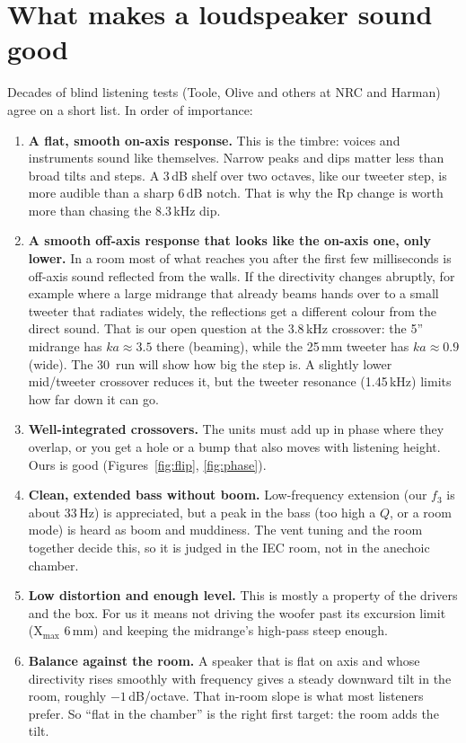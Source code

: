 \documentclass[11pt,a4paper]{article}
\begin{document}
\section{What makes a loudspeaker sound good}
Decades of blind listening tests (Toole, Olive and others at NRC and Harman) agree on a short list. In order of importance:
\begin{enumerate}[leftmargin=*]
\item \textbf{A flat, smooth on-axis response.} This is the timbre: voices and instruments sound like
themselves. Narrow peaks and dips matter less than broad tilts and steps. A 3\,dB shelf over two
octaves, like our tweeter step, is more audible than a sharp 6\,dB notch. That is why the Rp change is worth more than chasing the 8.3\,kHz dip.
\item \textbf{A smooth off-axis response that looks like the on-axis one, only lower.} In a room most
of what reaches you after the first few milliseconds is off-axis sound reflected from the walls. If the
directivity changes abruptly, for example where a large midrange that already beams hands over to a
small tweeter that radiates widely, the reflections get a different colour from the direct sound. That
is our open question at the 3.8\,kHz crossover: the 5\textonequarter'' midrange has $ka \approx 3.5$
there (beaming), while the 25\,mm tweeter has $ka \approx 0.9$ (wide). The 30\textdegree\ run will show how big
the step is. A slightly lower mid/tweeter crossover reduces it, but the tweeter resonance (1.45\,kHz) limits how far down it can go.
\item \textbf{Well-integrated crossovers.} The units must add up in phase where they overlap, or you
get a hole or a bump that also moves with listening height. Ours is good (Figures~\ref{fig:flip}, \ref{fig:phase}).
\item \textbf{Clean, extended bass without boom.} Low-frequency extension (our $f_3$ is about 33\,Hz) is
appreciated, but a peak in the bass (too high a $Q$, or a room mode) is heard as boom and muddiness. The
vent tuning and the room together decide this, so it is judged in the IEC room, not in the anechoic chamber.
\item \textbf{Low distortion and enough level.} This is mostly a property of the drivers and the box. For
us it means not driving the woofer past its excursion limit (X$_\mathrm{max}$ 6\,mm) and keeping the
midrange's high-pass steep enough.
\item \textbf{Balance against the room.} A speaker that is flat on axis and whose directivity rises
smoothly with frequency gives a steady downward tilt in the room, roughly $-1$\,dB/octave. That
in-room slope is what most listeners prefer. So ``flat in the chamber'' is the right first target: the room adds the tilt.
\end{enumerate}
\end{document}
